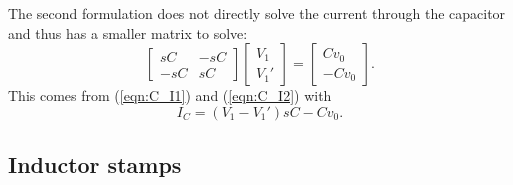 \documentclass[a4paper, 12pt]{article}
\newcommand{\encp}[1]{\left(#1\right)}
\newcommand{\refeqn}[1]{\mbox{(\ref{eqn:#1})}}
\begin{document}
The second formulation does not directly solve the current through the
capacitor and thus has a smaller matrix to solve:
%
\begin{equation}
  \begin{bmatrix}
    sC & -sC \\
   -sC & sC
  \end{bmatrix}
  \begin{bmatrix}
    V_1 \\ V_1'
  \end{bmatrix}
=
\begin{bmatrix}
  C v_0 \\ -C v_0
\end{bmatrix}.
\end{equation}
%
This comes from \refeqn{C_I1} and \refeqn{C_I2} with 
%
\begin{equation}
    I_C  =  \encp{V_1 - V_1'}sC - C v_0.
\end{equation}


\subsection{Inductor stamps}
\end{document}
